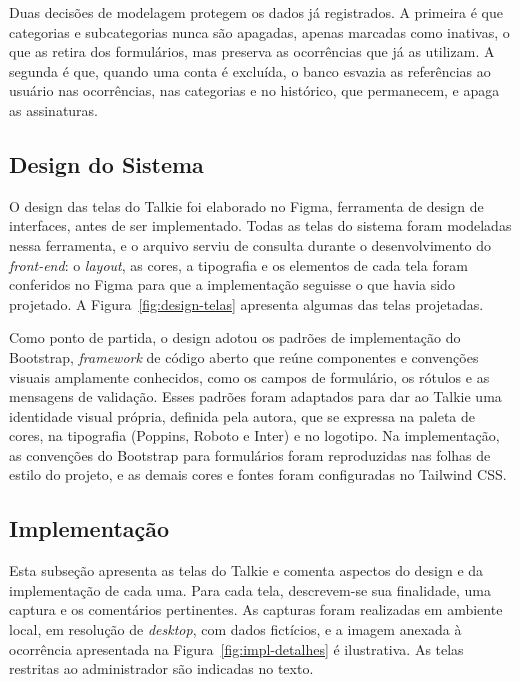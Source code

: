 \documentclass[12pt,a4paper]{article}
\begin{document}
Duas decisões de modelagem protegem os dados já registrados. A primeira é que categorias e subcategorias nunca são apagadas, apenas marcadas como inativas, o que as retira dos formulários, mas preserva as ocorrências que já as utilizam. A segunda é que, quando uma conta é excluída, o banco esvazia as referências ao usuário nas ocorrências, nas categorias e no histórico, que permanecem, e apaga as assinaturas.


\subsection{Design do Sistema}
O design das telas do Talkie foi elaborado no Figma, ferramenta de design de interfaces, antes de ser implementado. Todas as telas do sistema foram modeladas nessa ferramenta, e o arquivo serviu de consulta durante o desenvolvimento do \textit{front-end}: o \textit{layout}, as cores, a tipografia e os elementos de cada tela foram conferidos no Figma para que a implementação seguisse o que havia sido projetado. A Figura~\ref{fig:design-telas} apresenta algumas das telas projetadas.


Como ponto de partida, o design adotou os padrões de implementação do Bootstrap, \textit{framework} de código aberto que reúne componentes e convenções visuais amplamente conhecidos, como os campos de formulário, os rótulos e as mensagens de validação. Esses padrões foram adaptados para dar ao Talkie uma identidade visual própria, definida pela autora, que se expressa na paleta de cores, na tipografia (Poppins, Roboto e Inter) e no logotipo. Na implementação, as convenções do Bootstrap para formulários foram reproduzidas nas folhas de estilo do projeto, e as demais cores e fontes foram configuradas no Tailwind CSS.


\subsection{Implementação}
Esta subseção apresenta as telas do Talkie e comenta aspectos do design e da implementação de cada uma. Para cada tela, descrevem-se sua finalidade, uma captura e os comentários pertinentes. As capturas foram realizadas em ambiente local, em resolução de \textit{desktop}, com dados fictícios, e a imagem anexada à ocorrência apresentada na Figura~\ref{fig:impl-detalhes} é ilustrativa. As telas restritas ao administrador são indicadas no texto.
\end{document}
